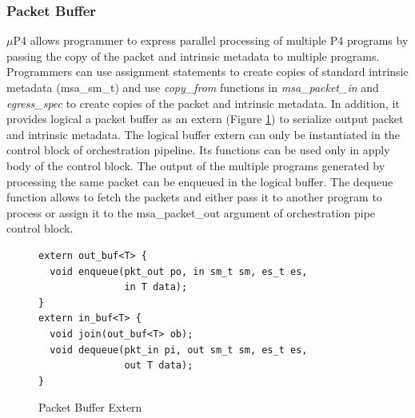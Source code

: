\documentclass{hotnets19}
\begin{document}
\subsubsection{Packet Buffer}
$\mu$P4 allows programmer to express parallel processing of multiple P4 programs by passing the copy of the packet and intrinsic metadata to multiple programs.
Programmers can use assignment statements to create copies of standard intrinsic metadata (msa\_sm\_t) and use \emph{copy\_from} functions in \emph{msa\_packet\_in} and \emph{egress\_spec} to create copies of the packet and intrinsic metadata.
In addition, it provides logical a packet buffer as an extern (Figure \ref{fig:msa-packet-buffer-extern}) to serialize output packet and intrinsic metadata.
The logical buffer extern can only be instantiated in the control block of orchestration pipeline.
Its functions can be used only in apply body of the control block.
The output of the multiple programs generated by processing the same packet can be enqueued in the logical buffer.
The dequeue function allows to fetch the packets and either pass it to another program to process or assign it to the msa\_packet\_out argument of orchestration pipe control block.
\begin{figure}[!h]
\begin{lstlisting}[frame=none]
extern out_buf<T> {
  void enqueue(pkt_out po, in sm_t sm, es_t es,
               in T data); 
}
extern in_buf<T> {
  void join(out_buf<T> ob);
  void dequeue(pkt_in pi, out sm_t sm, es_t es, 
               out T data); 
}
\end{lstlisting}
\caption{Packet Buffer Extern}
\label{fig:msa-packet-buffer-extern}
\end{figure}
\end{document}
